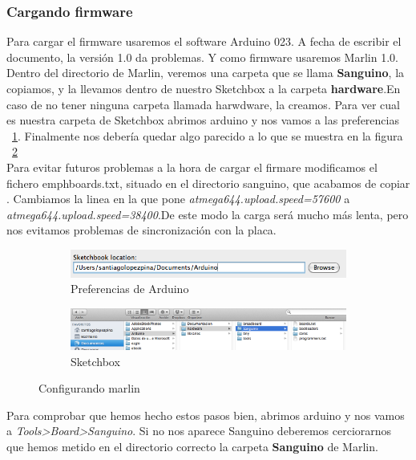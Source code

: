 		\subsubsection{Cargando firmware}
		Para cargar el firmware usaremos el software Arduino 023. A fecha de escribir el documento, la versión 1.0 da problemas. Y como firmware usaremos Marlin 1.0.\\
		Dentro del directorio de Marlin, veremos una carpeta que se llama \textbf{Sanguino}, la copiamos, y la llevamos dentro de nuestro Sketchbox a la carpeta \textbf{hardware}.En caso de no tener ninguna carpeta llamada harwdware, la creamos. Para ver cual es nuestra carpeta de Sketchbox abrimos arduino y nos vamos a las preferencias ~\ref{fig:pref.arduino}. Finalmente nos debería quedar algo parecido a lo que se muestra en la figura ~\ref{fig:sketchbox.arduino}\\
		Para evitar futuros problemas a la hora de cargar el firmare modificamos el fichero emph{boards.txt}, situado en el directorio sanguino, que acabamos de copiar .
		Cambiamos la linea en la que pone \emph{atmega644.upload.speed=57600} a \emph{atmega644.upload.speed=38400}.De este modo la carga será mucho más lenta, pero nos evitamos problemas de sincronización con la placa.\\
		
		\begin{figure}[H]
		        \centering
		        \begin{subfigure}[b]{0.7\textwidth}
		                \centering
		                \includegraphics[width=\textwidth]{../../Fotos/29.png}
		                \caption{Preferencias de Arduino }
		                \label{fig:pref.arduino}
		        \end{subfigure}
		        \begin{subfigure}[b]{0.7\textwidth}
		                \centering
		                \includegraphics[width=\textwidth]{../../Fotos/30.png}
		                \caption{Sketchbox}
		                \label{fig:sketchbox.arduino}
		        \end{subfigure}
		        \caption{Configurando marlin}\label{fig:Marlin}
		\end{figure}
		Para comprobar que hemos hecho estos pasos bien, abrimos arduino y nos vamos a \emph{Tools>Board>Sanguino}. Si no nos aparece Sanguino deberemos cerciorarnos que hemos metido en el directorio correcto la carpeta \textbf{Sanguino} de Marlin.\\
		
